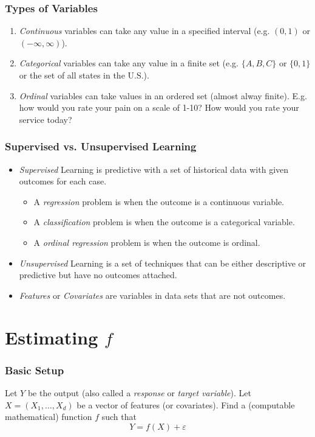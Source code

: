 \documentclass[
	11pt, %
]{beamer}
\begin{document}
\begin{frame}
	\frametitle{Types of Variables}
	\begin{enumerate}
		\item \emph{Continuous} variables can take any value in a specified interval (e.g. $(0,1)$ or $(-\infty, \infty)$).
			\pause
			\vfill
		\item \emph{Categorical} variables can take any value in a finite set (e.g. $\{A,B,C\}$ or $\{0,1\}$ or the set of all states in the U.S.).
			\pause
			\vfill
		\item \emph{Ordinal} variables can take values in an ordered set (almost alway finite). E.g. how would you rate your pain on a scale of 1-10? How would you rate your service today?
			\vfill
	\end{enumerate}

\end{frame}

\begin{frame}
	\frametitle{Supervised vs. Unsupervised Learning}
	\begin{itemize}
		\item \emph{Supervised} Learning is predictive with a set of historical data with given outcomes for each case. 
			\vfill
			\pause
			\begin{itemize}
				\item A \emph{regression} problem is when the outcome is a continuous variable.
					\vfill
					\pause
				\item A \emph{classification} problem is when the outcome is a categorical variable.
					\vfill
					\pause
				\item A \emph{ordinal regression} problem is when the outcome is ordinal.
					\vfill
					\pause
			\end{itemize}
		\item \emph{Unsupervised} Learning is a set of techniques that can be either descriptive or predictive but have no outcomes attached.
			\vfill
			\pause
		\item \emph{Features} or \emph{Covariates} are variables in data sets that are not outcomes.
	\end{itemize}
\end{frame}

\section{Estimating $f$}
\begin{frame}
	\frametitle{Basic Setup}
	Let $Y$ be the output (also called a \emph{response} or \emph{target variable}).
	\vfill
	\pause
	Let $X = (X_1, \ldots, X_d)$ be a vector of features (or covariates).
	\vfill
	\pause
	Find a (computable mathematical) function $f$ such that 
	\[Y = f(X) + \varepsilon\]
	\vfill
\end{frame}
\end{document}
